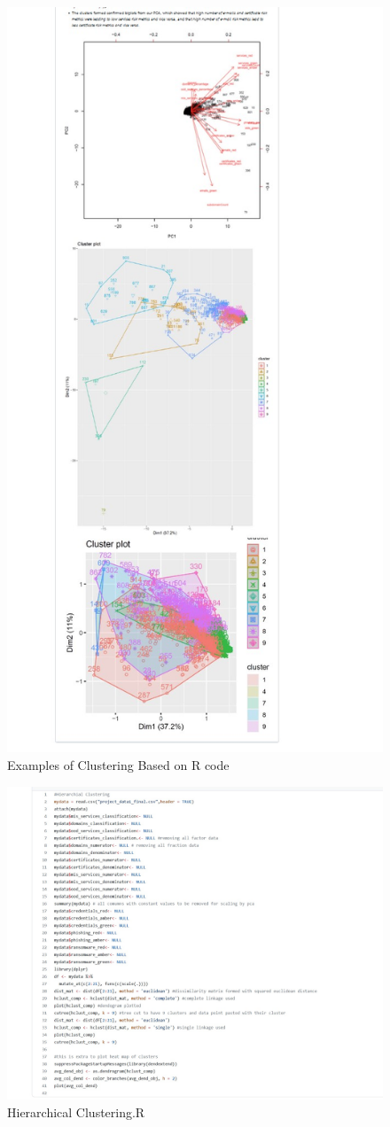\documentclass[fleqn,10pt]{olplainarticle}
\begin{document}
\begin{figure}[ht]
\centering
\includegraphics[angle=0,width=.7\linewidth]{GitAssignmentClustering.jpg}
\caption{Examples of Clustering Based on R code} 
\label{fig:view}
\end{figure}
\bigskip


\begin{figure}[ht]
\centering
\includegraphics[angle=0,width=.7\linewidth]{R-Code-Her.jpg}
\caption{Hierarchical Clustering.R} 
\label{fig:view}
\end{figure}
\bigskip
\end{document}
